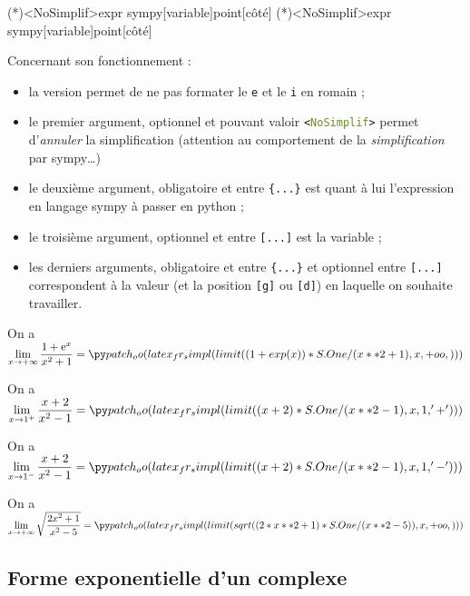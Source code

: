 \documentclass[french,a4paper,11pt]{article}
\newcommand\Cle[1]{{\bfseries\sffamily\textlangle #1\textrangle}}
\begin{document}
\begin{bloctext}
\sympylim(*)<NoSimplif>{expr sympy}[variable]{point}[côté]
\dsympylim(*)<NoSimplif>{expr sympy}[variable]{point}[côté]
\end{bloctext}

\begin{tipblock}
Concernant son fonctionnement :

\begin{itemize}
	\item la version \Cle{*} permet de ne pas formater le \texttt{e} et le \texttt{i} en \textsf{romain} ;
	\item le premier argument, optionnel et pouvant valoir \texttt{<\textcolor{OliveDrab}{NoSimplif}>} permet d'\textit{annuler} la simplification (attention au comportement de la \textit{simplification} par \textsf{sympy}\ldots)
	\item le deuxième argument, obligatoire et entre \texttt{\{...\}} est quant à lui l'expression en langage \textsf{sympy} à passer en \textsf{python} ;
	\item le troisième argument, optionnel et entre \texttt{[...]} est la variable ;
	\item les derniers arguments, obligatoire et entre \texttt{\{...\}} et optionnel entre \texttt{[...]} correspondent à la valeur (et la position \texttt{[g]} ou \texttt{[d]}) en laquelle on souhaite travailler.
\end{itemize}
\vspace*{-\baselineskip}\leavevmode
\end{tipblock}

\begin{bloctext}
On a $\lim\limits_{x \to +\infty} \dfrac{1+\e^x}{x^2+1} = \sympylim{(1+exp(x))/(x**2+1)}{+oo}$
\end{bloctext}

\begin{bloctext}
On a $\lim\limits_{x \to 1^+} \dfrac{x+2}{x^2-1} = \sympylim{(x+2)/(x**2-1)}{1}[d]$

On a $\lim\limits_{x \to 1^-} \dfrac{x+2}{x^2-1} = \sympylim{(x+2)/(x**2-1)}{1}[g]$
\end{bloctext}

\begin{bloctext}
On a $\lim\limits_{x \to +\infty} \sqrt{\dfrac{2x^2+1}{x^2-5}} = \sympylim{sqrt((2*x**2+1)/(x**2-5))}{+oo}$
\end{bloctext}

\subsection{Forme exponentielle d'un complexe}
\end{document}
